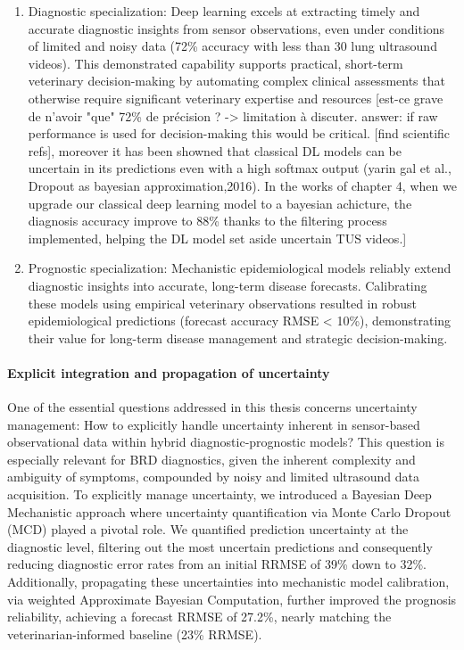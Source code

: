 \begin{enumerate}
    \item Diagnostic specialization: Deep learning excels at extracting timely and accurate diagnostic insights from sensor observations, even under conditions of limited and noisy data (72\% accuracy with less than 30 lung ultrasound videos). This demonstrated capability supports practical, short-term veterinary decision-making by automating complex clinical assessments that otherwise require significant veterinary expertise and resources [est-ce grave de n'avoir "que" 72\% de précision ? -> limitation à discuter. answer: if raw performance is used for decision-making this would be critical. [find scientific refs], moreover it has been showned that classical DL models can be uncertain in its predictions even with a high softmax output (yarin gal et al., Dropout as bayesian approximation,2016). In the works of chapter 4, when we upgrade our classical deep learning model to a bayesian achicture, the diagnosis accuracy improve to 88\% thanks to the filtering process implemented, helping the DL model set aside uncertain TUS videos.]
    
    \item Prognostic specialization: Mechanistic epidemiological models reliably extend diagnostic insights into accurate, long-term disease forecasts. Calibrating these models using empirical veterinary observations resulted in robust epidemiological predictions (forecast accuracy RMSE < 10\%), demonstrating their value for long-term disease management and strategic decision-making.
\end{enumerate}

\paragraph{Explicit integration and propagation of uncertainty} One of the essential questions addressed in this thesis concerns uncertainty management: How to explicitly handle uncertainty inherent in sensor-based observational data within hybrid diagnostic-prognostic models? This question is especially relevant for BRD diagnostics, given the inherent complexity and ambiguity of symptoms, compounded by noisy and limited ultrasound data acquisition. To explicitly manage uncertainty, we introduced a Bayesian Deep Mechanistic approach where uncertainty quantification via Monte Carlo Dropout (MCD) played a pivotal role. We quantified prediction uncertainty at the diagnostic level, filtering out the most uncertain predictions and consequently reducing diagnostic error rates from an initial RRMSE of 39\% down to 32\%. Additionally, propagating these uncertainties into mechanistic model calibration, via weighted Approximate Bayesian Computation, further improved the prognosis reliability, achieving a forecast RRMSE of 27.2\%, nearly matching the veterinarian-informed baseline (23\% RRMSE).

